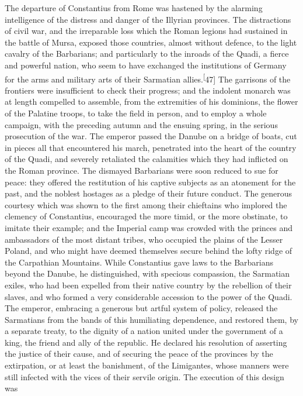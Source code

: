 The departure of Constantius from Rome was hastened by the
alarming intelligence of the distress and danger of the Illyrian
provinces. The distractions of civil war, and the irreparable
loss which the Roman legions had sustained in the battle of
Mursa, exposed those countries, almost without defence, to the
light cavalry of the Barbarians; and particularly to the inroads
of the Quadi, a fierce and powerful nation, who seem to have
exchanged the institutions of Germany for the arms and military
arts of their Sarmatian allies.\textsuperscript[47] The garrisons of the frontiers
were insufficient to check their progress; and the indolent
monarch was at length compelled to assemble, from the extremities
of his dominions, the flower of the Palatine troops, to take the
field in person, and to employ a whole campaign, with the
preceding autumn and the ensuing spring, in the serious
prosecution of the war. The emperor passed the Danube on a bridge
of boats, cut in pieces all that encountered his march,
penetrated into the heart of the country of the Quadi, and
severely retaliated the calamities which they had inflicted on
the Roman province. The dismayed Barbarians were soon reduced to
sue for peace: they offered the restitution of his captive
subjects as an atonement for the past, and the noblest hostages
as a pledge of their future conduct. The generous courtesy which
was shown to the first among their chieftains who implored the
clemency of Constantius, encouraged the more timid, or the more
obstinate, to imitate their example; and the Imperial camp was
crowded with the princes and ambassadors of the most distant
tribes, who occupied the plains of the Lesser Poland, and who
might have deemed themselves secure behind the lofty ridge of the
Carpathian Mountains. While Constantius gave laws to the
Barbarians beyond the Danube, he distinguished, with specious
compassion, the Sarmatian exiles, who had been expelled from
their native country by the rebellion of their slaves, and who
formed a very considerable accession to the power of the Quadi.
The emperor, embracing a generous but artful system of policy,
released the Sarmatians from the bands of this humiliating
dependence, and restored them, by a separate treaty, to the
dignity of a nation united under the government of a king, the
friend and ally of the republic. He declared his resolution of
asserting the justice of their cause, and of securing the peace
of the provinces by the extirpation, or at least the banishment,
of the Limigantes, whose manners were still infected with the
vices of their servile origin. The execution of this design was
